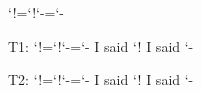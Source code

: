 \documentclass{article}
\edef\oldCCofEXC{\the\catcode`!}
\edef\oldCCofDASH{\the\catcode`-}
\edef\newCCofEXC{\the\catcode`!}
\edef\newCCofDASH{\the\catcode`-}
\newcommand{\oldCCforEXC}{\catcode`!=\oldCCofEXC}
\newcommand{\newCCforEXC}{\catcode`!=\newCCofEXC}
\newcommand{\oldCCforDASH}{\catcode`-=\oldCCofDASH}
\newcommand{\newCCforDASH}{\catcode`-=\newCCofDASH}
\begin{document}
\newCCforEXC{}\newCCforDASH{}
	
T1: \oldCCforEXC{}\oldCCforDASH{}
I said \the\catcode`!
I said \the\catcode`-

T2: \newCCforEXC{}\newCCforDASH{}
I said \the\catcode`!
I said \the\catcode`-
\end{document}
